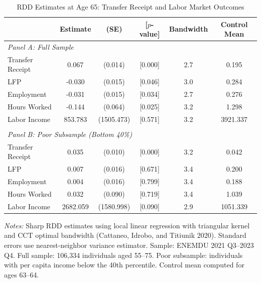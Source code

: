 \begin{table}[t]
\centering
\begin{threeparttable}
\caption{RDD Estimates at Age 65: Transfer Receipt and Labor Market Outcomes}
\label{tab:main_rdd}
\begin{tabular}{lccccc}
\hline\hline
  & Estimate & (SE) & [$p$-value] & Bandwidth & Control Mean \\
\hline
  \multicolumn{6}{l}{\textit{Panel A: Full Sample}} \\
  Transfer Receipt & 0.067 & (0.014) & [0.000] & 2.7 & 0.195 \\
  LFP & -0.030 & (0.015) & [0.046] & 3.0 & 0.284 \\
  Employment & -0.031 & (0.015) & [0.034] & 2.7 & 0.276 \\
  Hours Worked & -0.144 & (0.064) & [0.025] & 3.2 & 1.298 \\
  Labor Income & 853.783 & (1505.473) & [0.571] & 3.2 & 3921.337 \\
  \\
  \multicolumn{6}{l}{\textit{Panel B: Poor Subsample (Bottom 40\%)}} \\
  Transfer Receipt & 0.035 & (0.010) & [0.000] & 3.2 & 0.042 \\
  LFP & 0.007 & (0.016) & [0.671] & 3.4 & 0.200 \\
  Employment & 0.004 & (0.016) & [0.799] & 3.4 & 0.188 \\
  Hours Worked & 0.032 & (0.090) & [0.719] & 3.4 & 1.039 \\
  Labor Income & 2682.059 & (1580.998) & [0.090] & 2.9 & 1051.339 \\
\hline\hline
\end{tabular}
\begin{tablenotes}
\item \textit{Notes:} Sharp RDD estimates using local linear regression with triangular kernel and CCT optimal bandwidth (Cattaneo, Idrobo, and Titiunik 2020). Standard errors use nearest-neighbor variance estimator. Sample: ENEMDU 2021 Q3--2023 Q4. Full sample: 106,334 individuals aged 55--75. Poor subsample: individuals with per capita income below the 40th percentile. Control mean computed for ages 63--64.
\end{tablenotes}
\end{threeparttable}
\end{table}
